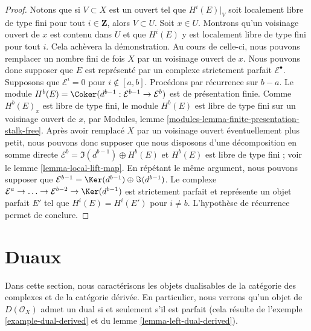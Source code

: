 {\begin{proof}

Notons que si $V \subset X$ est un ouvert tel que $H^i(E)|_V$
soit localement libre de type fini pour tout $i \in \mathbf{Z}$, alors $V \subset U$. Soit $x \in U$. Montrons qu'un voisinage ouvert de $x$
est contenu dans $U$ et que $H^i(E)$ y est localement libre de type fini pour tout $i$. Cela achèvera la démonstration. Au cours de celle-ci, nous pouvons remplacer un nombre fini de fois
$X$ par un voisinage ouvert de $x$. Nous pouvons donc supposer que $E$ est représenté par un complexe strictement parfait $\mathcal{E}^\bullet$. Supposons que
$\mathcal{E}^i = 0$ pour $i \not \in [a, b]$. Procédons par récurrence sur $b - a$. Le module
$H^b(E) = \Coker(d^{b - 1} : \mathcal{E}^{b - 1} \to \mathcal{E}^b)$
est de présentation finie. Comme $H^b(E)_x$ est libre de type fini, le module $H^b(E)$ est libre de type fini sur un voisinage ouvert de $x$, par Modules, lemme \ref{modules-lemma-finite-presentation-stalk-free}. Après avoir remplacé $X$ par un voisinage ouvert éventuellement plus petit, nous pouvons donc supposer que nous disposons d'une décomposition en somme directe
$\mathcal{E}^b = \Im(d^{b - 1}) \oplus H^b(E)$ et
$H^b(E)$ est libre de type fini ; voir le lemme \ref{lemma-local-lift-map}. En répétant le même argument, nous pouvons supposer que $\mathcal{E}^{b - 1} = \Ker(d^{b - 1}) \oplus \Im(d^{b - 1})$. Le complexe
$\mathcal{E}^a \to \ldots \to \mathcal{E}^{b - 2} \to \Ker(d^{b - 1})$
est strictement parfait et représente un objet parfait $E'$ tel que $H^i(E) = H^i(E')$ pour $i \not = b$. L'hypothèse de récurrence permet de conclure.

\end{proof}





\section{Duaux}

\label{section-duals}

\noindent
Dans cette section, nous caractérisons les objets dualisables de la catégorie des complexes et de la catégorie dérivée. En particulier, nous verrons qu'un objet de $D(\mathcal{O}_X)$ admet un dual si et seulement s'il est parfait (cela résulte de l'exemple \ref{example-dual-derived} et du lemme \ref{lemma-left-dual-derived}).

\begin{lemma}


\end{lemma}}
